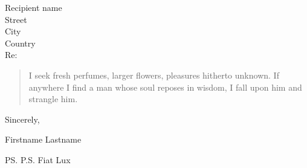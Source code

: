 \documentclass[12pt,letterpaper]{letter} %
\def\Who{Firstname Lastname} %
\begin{document}
\begin{letter}{Recipient name \\ Street\\ City\\ Country \\ [\parskip]
Re:}
\begin{verse}
I seek fresh perfumes, larger flowers, pleasures hitherto unknown. If anywhere I find a man whose soul reposes in wisdom, I fall upon him and strangle him.
\end{verse}


\closing{Sincerely,}
\Who{}


\ps{P.S. Fiat Lux}



\end{letter}
\end{document}
